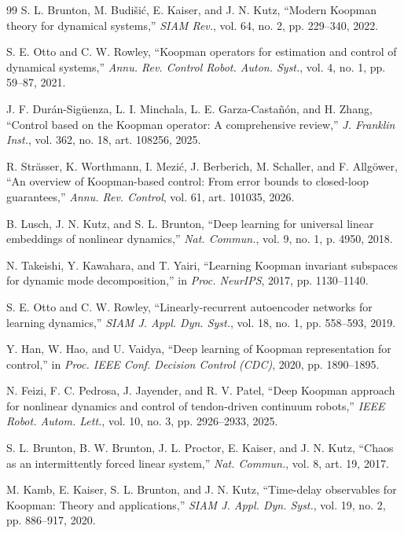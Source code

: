 \documentclass[journal]{IEEEtran}
\begin{document}
\begin{thebibliography}{99}
S. L. Brunton, M. Budi\v{s}i\'c, E. Kaiser, and J. N. Kutz, ``Modern Koopman theory for dynamical systems,'' \emph{SIAM Rev.}, vol. 64, no. 2, pp. 229--340, 2022.

S. E. Otto and C. W. Rowley, ``Koopman operators for estimation and control of dynamical systems,'' \emph{Annu. Rev. Control Robot. Auton. Syst.}, vol. 4, no. 1, pp. 59--87, 2021.

J. F. Dur\'an-Sig\"uenza, L. I. Minchala, L. E. Garza-Casta\~n\'on, and H. Zhang, ``Control based on the Koopman operator: A comprehensive review,'' \emph{J. Franklin Inst.}, vol. 362, no. 18, art. 108256, 2025.

R. Str\"asser, K. Worthmann, I. Mezi\'c, J. Berberich, M. Schaller, and F. Allg\"ower, ``An overview of Koopman-based control: From error bounds to closed-loop guarantees,'' \emph{Annu. Rev. Control}, vol. 61, art. 101035, 2026.

B. Lusch, J. N. Kutz, and S. L. Brunton, ``Deep learning for universal linear embeddings of nonlinear dynamics,'' \emph{Nat. Commun.}, vol. 9, no. 1, p. 4950, 2018.

N. Takeishi, Y. Kawahara, and T. Yairi, ``Learning Koopman invariant subspaces for dynamic mode decomposition,'' in \emph{Proc. NeurIPS}, 2017, pp. 1130--1140.

S. E. Otto and C. W. Rowley, ``Linearly-recurrent autoencoder networks for learning dynamics,'' \emph{SIAM J. Appl. Dyn. Syst.}, vol. 18, no. 1, pp. 558--593, 2019.

Y. Han, W. Hao, and U. Vaidya, ``Deep learning of Koopman representation for control,'' in \emph{Proc. IEEE Conf. Decision Control (CDC)}, 2020, pp. 1890--1895.

N. Feizi, F. C. Pedrosa, J. Jayender, and R. V. Patel, ``Deep Koopman approach for nonlinear dynamics and control of tendon-driven continuum robots,'' \emph{IEEE Robot. Autom. Lett.}, vol. 10, no. 3, pp. 2926--2933, 2025.

S. L. Brunton, B. W. Brunton, J. L. Proctor, E. Kaiser, and J. N. Kutz, ``Chaos as an intermittently forced linear system,'' \emph{Nat. Commun.}, vol. 8, art. 19, 2017.

M. Kamb, E. Kaiser, S. L. Brunton, and J. N. Kutz, ``Time-delay observables for Koopman: Theory and applications,'' \emph{SIAM J. Appl. Dyn. Syst.}, vol. 19, no. 2, pp. 886--917, 2020.


\end{thebibliography}
\end{document}
